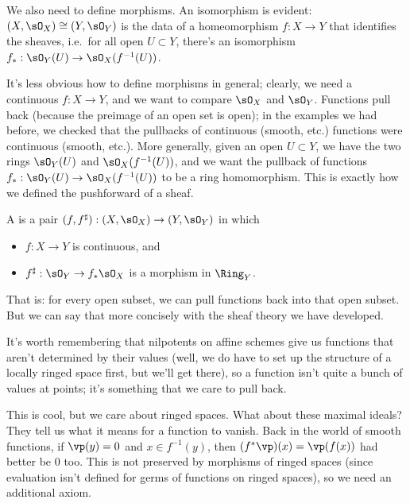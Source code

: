 We also need to define morphisms. An isomorphism is evident: \((X,\sO_X)\cong (Y,\sO_Y)\) is the data of a
homeomorphism \(f:X\to Y\) that identifies the sheaves, i.e.\ for all open \(U\subset Y\), there's an isomorphism
\(f_*: \sO_Y(U)\to \sO_X(f^{-1}(U))\).

It's less obvious how to define morphisms in general; clearly, we need a continuous \(f:X\to Y\), and we want to
compare \(\sO_X\) and \(\sO_Y\). Functions pull back (because the preimage of an open set is open); in the examples
we had before, we checked that the pullbacks of continuous (smooth, etc.) functions were continuous (smooth, etc.).
More generally, given an open \(U\subset Y\), we have the two rings \(\sO_Y(U)\) and \(\sO_X(f^{-1}(U))\), and we
want the pullback of functions \(f_*:\sO_Y(U)\to\sO_X(f^{-1}(U))\) to be a ring homomorphism. This is exactly how
we defined the pushforward of a sheaf.
\begin{defn}
A  is a pair \((f,f^\sharp): (X,\sO_X)\to (Y,\sO_Y)\) in which
\begin{itemize}
	\item \(f:X\to Y\) is continuous, and
	\item \(f^\sharp: \sO_Y\to f_*\sO_X\) is a morphism in \(\Ring_Y\).
\end{itemize}
\end{defn}
That is: for every open subset, we can pull functions back into that open subset. But we can say that more
concisely with the sheaf theory we have developed.

It's worth remembering that nilpotents on affine schemes give us functions that aren't determined by their values
(well, we do have to set up the structure of a locally ringed space first, but we'll get there), so a function
isn't quite a bunch of values at points; it's something that we care to pull back.

This is cool, but we care about ringed spaces. What about these maximal ideals? They tell us what it means for a
function to vanish. Back in the world of smooth functions, if \(\vp(y) = 0\) and \(x\in f^{-1}(y)\), then
\((f^*\vp)(x) = \vp(f(x))\) had better be \(0\) too. This is not preserved by morphisms of ringed spaces (since
evaluation isn't defined for germs of functions on ringed spaces), so we need an additional axiom.

